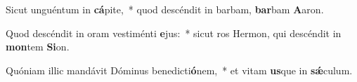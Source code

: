 \item Sicut unguéntum in \textbf{cá}pite,~* quod descéndit in barbam, \textbf{bar}bam \textbf{A}aron.
\item Quod descéndit in oram vestiménti \textbf{e}jus:~* sicut ros Hermon, qui descéndit in \textbf{mon}tem \textbf{Si}on.
\item Quóniam illic mandávit Dóminus benedicti\textbf{ó}nem,~* et vitam \textbf{us}que in \textbf{sǽ}culum.
